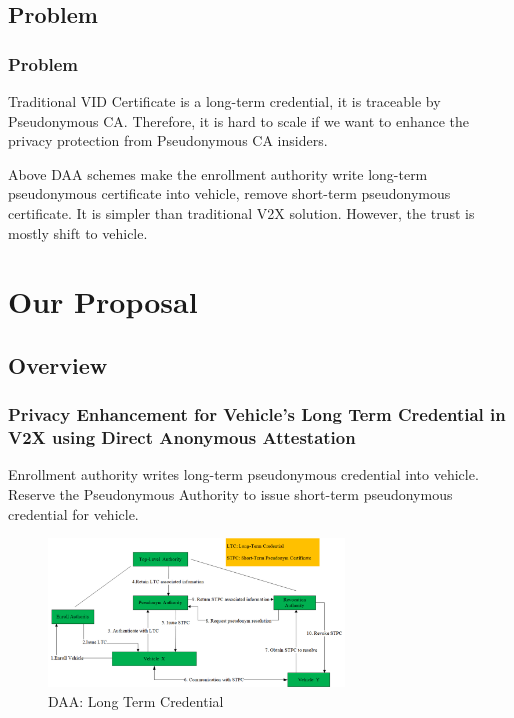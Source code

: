 \documentclass{ctexbeamer}
\begin{document}
\subsection{Problem}
\begin{frame}
\frametitle{Problem}

Traditional VID Certificate is a long-term credential, it is traceable by Pseudonymous CA. 
\newline
Therefore, it is hard to scale if we want to enhance the privacy protection from Pseudonymous CA insiders.
\newline
\newline

Above DAA schemes make the enrollment authority write long-term pseudonymous certificate into vehicle, remove short-term pseudonymous certificate.
\newline
It is simpler than traditional V2X solution.
However, the trust is mostly shift to vehicle.

\end{frame}

\section{Our Proposal}

\subsection{Overview}
\begin{frame}
\frametitle{Privacy Enhancement for Vehicle's Long Term Credential in V2X using Direct Anonymous Attestation}

Enrollment authority writes long-term pseudonymous credential into vehicle.
\newline
Reserve the Pseudonymous Authority to issue short-term pseudonymous credential for vehicle.

    \begin{figure}[H]
        \centering 
        \includegraphics[width=0.70\textwidth]{pic/ltc.daa.png} 
        \caption{DAA: Long Term Credential} 
        \label{fig.ltc.daa}
    \end{figure}

\end{frame}
\end{document}
